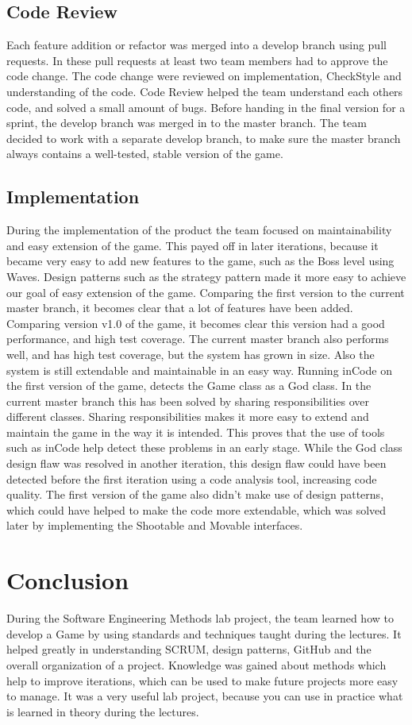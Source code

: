 \documentclass[10pt]{article}
\begin{document}
\subsection*{Code Review}
Each feature addition or refactor was merged into a develop branch using pull requests. In these pull requests at least two team members had to approve the code change. The code change were reviewed on implementation, CheckStyle and understanding of the code. Code Review helped the team understand each others code, and solved a small amount of bugs. Before handing in the final version for a sprint, the develop branch was merged in to the master branch. The team decided to work with a separate develop branch, to make sure the master branch always contains a well-tested, stable version of the game.

\subsection*{Implementation}
During the implementation of the product the team focused on maintainability and easy extension of the game. This payed off in later iterations, because it became very easy to add new features to the game, such as the Boss level using Waves. Design patterns such as the strategy pattern made it more easy to achieve our goal of easy extension of the game. Comparing the first version to the current master branch, it becomes clear that a lot of features have been added. 
Comparing version v1.0 of the game, it becomes clear this version had a good performance, and high test coverage. The current master branch also performs well, and has high test coverage, but the system has grown in size. Also the system is still extendable and maintainable in an easy way. Running inCode on the first version of the game, detects the Game class as a God class. In the current master branch this has been solved by sharing responsibilities over different classes. 
Sharing responsibilities makes it more easy to extend and maintain the game in the way it is intended. This proves that the use of tools such as inCode help detect these problems in an early stage. While the God class design flaw was resolved in another iteration, this design flaw could have been detected before the first iteration using a code analysis tool, increasing code quality. The first version of the game also didn't make use of design patterns, which could have helped to make the code more extendable, which was solved later by implementing the Shootable and Movable interfaces.

\newpage
\section*{Conclusion}
During the Software Engineering Methods lab project, the team learned how to develop a Game by using standards and techniques taught during the lectures. It helped greatly in understanding SCRUM, design patterns, GitHub and the overall organization of a project. Knowledge was gained about methods which help to improve iterations, which can be used to make future projects more easy to manage. It was a very useful lab project, because you can use in practice what is learned in theory during the lectures.
\end{document}
